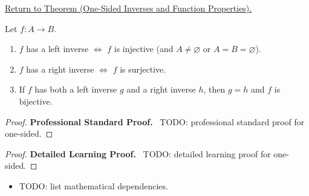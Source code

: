 \newpage
{}
\label{prf:one-sided}

\begin{remark*}[Return]
\hyperref[thm:one-sided]{Return to Theorem (One-Sided Inverses and Function Properties).}
\end{remark*}

\begin{theorem*}
Let $f : A \to B$.
\begin{enumerate}[label=(\roman*)]
\item $f$ has a left inverse $\iff$ $f$ is injective (and $A \neq \varnothing$ or $A=B=\varnothing$).
\item $f$ has a right inverse $\iff$ $f$ is surjective.
\item If $f$ has both a left inverse $g$ and a right inverse $h$, then $g = h$
and $f$ is bijective.
\end{enumerate}
\end{theorem*}

\begin{proof}
\textbf{Professional Standard Proof.}~
TODO: professional standard proof for one-sided.
\end{proof}

\begin{proof}
\textbf{Detailed Learning Proof.}~
TODO: detailed learning proof for one-sided.
\end{proof}

\begin{remark*}
\end{remark*}

\begin{dependencies}
\begin{itemize}
  \item TODO: list mathematical dependencies.
\end{itemize}
\end{dependencies}

\clearpage
